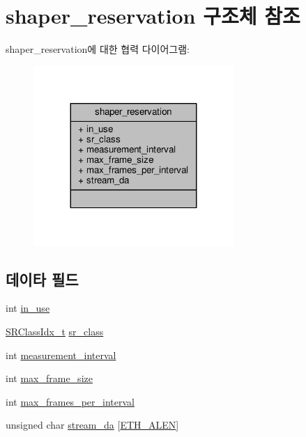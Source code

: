 \hypertarget{structshaper__reservation}{}\section{shaper\+\_\+reservation 구조체 참조}
\label{structshaper__reservation}


shaper\+\_\+reservation에 대한 협력 다이어그램\+:
\nopagebreak
\begin{figure}[H]
\begin{center}
\leavevmode
\includegraphics[width=215pt]{structshaper__reservation__coll__graph}
\end{center}
\end{figure}
\subsection*{데이타 필드}
\begin{DoxyCompactItemize}
\item 
int \hyperlink{structshaper__reservation_acd374dc544502235efa3c6533c75820f}{in\+\_\+use}
\item 
\hyperlink{openavb__types__base__pub_8h_a4d8ccbeaf8ad040d8880e8971fc62752}{S\+R\+Class\+Idx\+\_\+t} \hyperlink{structshaper__reservation_abd9f3cf34e5587f607b96c77560cc374}{sr\+\_\+class}
\item 
int \hyperlink{structshaper__reservation_a848591ef9ab34f6f2eb816fe385fa4d4}{measurement\+\_\+interval}
\item 
int \hyperlink{structshaper__reservation_a09c29b0090a82147afdb50ae0013b9c6}{max\+\_\+frame\+\_\+size}
\item 
int \hyperlink{structshaper__reservation_aace8d964835e57882addf0f51cb64f86}{max\+\_\+frames\+\_\+per\+\_\+interval}
\item 
unsigned char \hyperlink{structshaper__reservation_a29385104cedd9af8244dc9000ebb0929}{stream\+\_\+da} \mbox{[}\hyperlink{avb__avtp_8h_a9822d89774e0d6ddaa06503950130423}{E\+T\+H\+\_\+\+A\+L\+EN}\mbox{]}
\end{DoxyCompactItemize}



